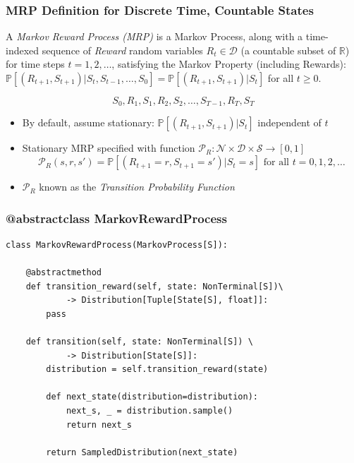 \documentclass[handout]{beamer}
\begin{document}
\begin{frame}
\frametitle{MRP Definition for Discrete Time, Countable States}
\pause
\begin{definition}
 A {\em Markov Reward Process (MRP)} is a Markov Process, along with a time-indexed sequence of {\em Reward} random variables $R_t \in \mathcal{D}$ (a countable subset of $\mathbb{R}$) for time steps $t=1, 2, \ldots$, satisfying the Markov Property (including Rewards): $\mathbb{P}[(R_{t+1}, S_{t+1}) | S_t, S_{t-1}, \ldots, S_0] = \mathbb{P}[(R_{t+1}, S_{t+1}) | S_t]$ for all $t \geq 0$.
 \end{definition}
 \pause
  $$S_0, R_1, S_1, R_2, S_2, \ldots, S_{T-1}, R_T, S_T$$
  \pause
 \begin{itemize}[<+->]
\item By default, assume stationary: $\mathbb{P}[(R_{t+1}, S_{t+1}) | S_t]$ independent of $t$
\item Stationary MRP specified with function $\mathcal{P}_R: \mathcal{N} \times \mathcal{D} \times \mathcal{S} \rightarrow [0,1]$
$$\mathcal{P}_R(s,r,s') = \mathbb{P}[(R_{t+1}=r, S_{t+1}=s') | S_t=s] \text{ for all } t = 0, 1, 2, \ldots$$
\item $\mathcal{P}_R$ known as the {\em Transition Probability Function}
\end{itemize}
\end{frame}


\begin{frame}[fragile]
\frametitle{@abstractclass MarkovRewardProcess}
\pause
\begin{lstlisting}
class MarkovRewardProcess(MarkovProcess[S]):

    @abstractmethod
    def transition_reward(self, state: NonTerminal[S])\
            -> Distribution[Tuple[State[S], float]]:
        pass
        
    def transition(self, state: NonTerminal[S]) \
            -> Distribution[State[S]]:
        distribution = self.transition_reward(state)

        def next_state(distribution=distribution):
            next_s, _ = distribution.sample()
            return next_s

        return SampledDistribution(next_state)
\end{lstlisting}            
\end{frame}
\end{document}
